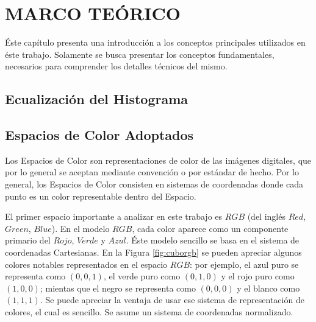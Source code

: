 \chapter{MARCO TEÓRICO}\label{sec:theorethical_framework}

Éste capítulo presenta una introducción a los conceptos principales utilizados en éste trabajo. Solamente se busca presentar los conceptos fundamentales, necesarios para comprender los detalles técnicos del mismo.

\section{Ecualización del Histograma}

\section{Espacios de Color Adoptados}\label{sec:color_spaces}

Los Espacios de Color \cite{Gonzalez02a} son representaciones de color de las imágenes digitales, que por lo general se aceptan mediante convención o por estándar de hecho. Por lo general, los Espacios de Color consisten en sistemas de coordenadas donde cada punto es un color representable dentro del Espacio.

El primer espacio importante a analizar en este trabajo es $RGB$ (del inglés $Red$, $Green$, $Blue$). En el modelo $RGB$, cada color aparece como un componente primario del $Rojo$, $Verde$ y $Azul$. Éste modelo sencillo se basa en el sistema de coordenadas Cartesianas. En la Figura \ref{fig:cuborgb} se pueden apreciar algunos colores notables representados en el espacio $RGB$: por ejemplo, el azul puro se representa como $(0,0,1)$, el verde puro como $(0,1,0)$ y el rojo puro como $(1,0,0)$; mientas que el negro se representa como $(0,0,0)$ y el blanco como $(1,1,1)$. Se puede apreciar la ventaja de usar ese sistema de representación de colores, el cual es sencillo. Se asume un sistema de coordenadas normalizado.

